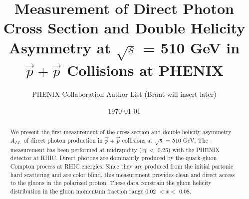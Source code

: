 \documentclass[twocolumn,letterpaper,aps,prl,longbibliography,superscriptaddress,floatfix]{revtex4-2}
\newcommand{\ALL}{\ensuremath{A_{LL}}}
\begin{document}


\title{Measurement of Direct Photon Cross Section and Double Helicity Asymmetry at $\sqrt{s}$ = 510 GeV in $\vec{p}+\vec{p}$ Collisions at PHENIX}

\author{PHENIX Collaboration Author List (Brant will insert later)}

\date{\today}

\begin{abstract}
We present the first measurement of the cross section and double helicity asymmetry \ALL\ of direct photon production in $\vec{p}+\vec{p}$ collisions at $\sqrt{s}$ = 510 GeV. The measurement has been performed at midrapidity ($|\eta| <$ 0.25) with the PHENIX detector at RHIC. Direct photons are dominantly produced by the quark-gluon Compton process at RHIC energies. Since they are produced from the initial partonic hard scattering and are color blind, this measurement provides clean and direct access to the gluons in the polarized proton. These data constrain the gluon helicity distribution in the gluon momentum fraction range 0.02 $< x <$ 0.08.
\end{abstract}

	
\maketitle

\end{document}
